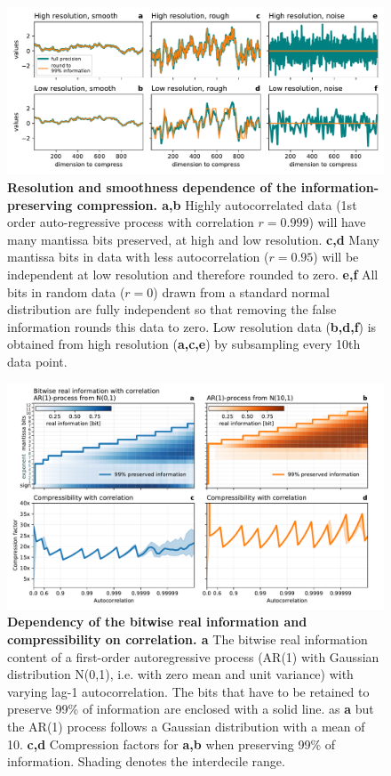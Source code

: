 \begin{figure}[tbhp]
	\includegraphics[width=1\textwidth]{Figures/compression/resolution_information.pdf}
	\caption{\textbf{Resolution and smoothness dependence of the information-preserving compression. a,b}
	Highly autocorrelated data (1st order auto-regressive process with correlation $r=0.999$) will have many
	mantissa bits preserved, at high and low resolution. \textbf{c,d} Many mantissa bits in data with less autocorrelation
	($r=0.95$) will be independent at low resolution and therefore rounded to zero. \textbf{e,f} All bits in random data ($r=0$)
	drawn from a standard normal distribution are fully independent so that removing the false information rounds
	this data to zero. Low resolution data (\textbf{b,d,f}) is obtained from high resolution (\textbf{a,c,e}) by subsampling every
	10th data point.}
	\label{fig:information_resolution}
\end{figure}

\begin{figure}[tbhp]
	\includegraphics[width=1\textwidth]{Figures/compression/correlation_ar1.pdf}
	\caption{\textbf{Dependency of the bitwise real information and compressibility on correlation. a}
	The bitwise real information content of a first-order autoregressive process (AR(1) with Gaussian distribution N(0,1),
	i.e. with zero mean and unit variance) with varying lag-1 autocorrelation. The bits that have to be retained to preserve
	99\% of information are enclosed with a solid line.  as \textbf{a} but the AR(1) process follows a Gaussian distribution with
	a mean of 10. \textbf{c,d} Compression factors for \textbf{a,b} when preserving 99\% of information. Shading denotes the interdecile range.}
	\label{fig:information_correlation}
\end{figure}

